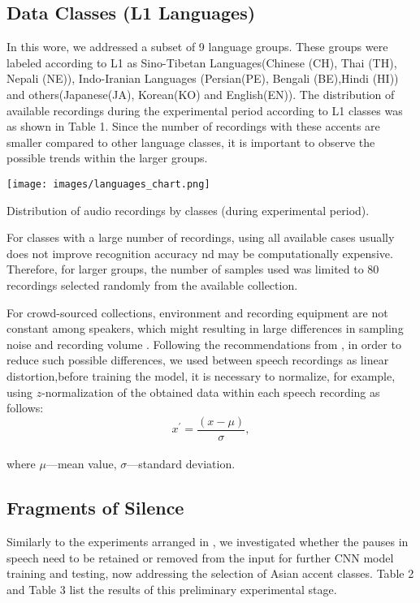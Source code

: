\documentclass[ams]{U-AizuGT}
\begin{document}
\subsection{Data Classes (L1 Languages)}
In this wore, we addressed a subset of 9 language groups. These groups were labeled according to L1 as Sino-Tibetan Languages(Chinese (CH), Thai (TH), Nepali (NE)), Indo-Iranian Languages (Persian(PE), Bengali (BE),Hindi (HI)) and others(Japanese(JA), Korean(KO) and English(EN)). The distribution of available recordings during the experimental period according to L1 classes was as shown in Table 1. Since the number of recordings with these accents are smaller compared to other language classes, it is important to  observe the possible trends within the larger groups.
\begin{table}[h]
    \centering
    \texttt{[image: images/languages\_chart.png]}
    \caption{Distribution of audio recordings by classes (during experimental period).}
    
\end{table}
For classes with a large number of recordings, using all available cases usually does not improve recognition accuracy nd may be computationally expensive. Therefore, for larger groups, the number of samples used was limited to 80 recordings selected randomly from the available collection.\par
For crowd-sourced collections, environment and recording equipment are not constant among speakers, which might resulting in large differences in sampling noise and recording volume \cite{Ahamad:acc}.
Following the recommendations from \cite{Veranika:lang}\cite{Ahamad:acc}, in order to reduce such possible differences, we used between speech recordings as linear distortion,before training the model, it is necessary to normalize, for example, using $z$-normalization of the obtained data within each speech recording as follows:
\\
\begin{equation}
x^{\prime}=\frac{(x-\mu)}{\sigma},
\end{equation}
\\
where $\mu$---mean value, $\sigma$---standard deviation.

\subsection{Fragments of Silence}

Similarly to the experiments arranged in \cite{Veranika:lang}\cite{Boula:the}, we investigated whether the pauses in speech need to be retained or removed from the input for further CNN model training and testing, now addressing the selection of Asian accent classes. Table 2 and Table 3 list  the results of this preliminary experimental stage. 
\end{document}
